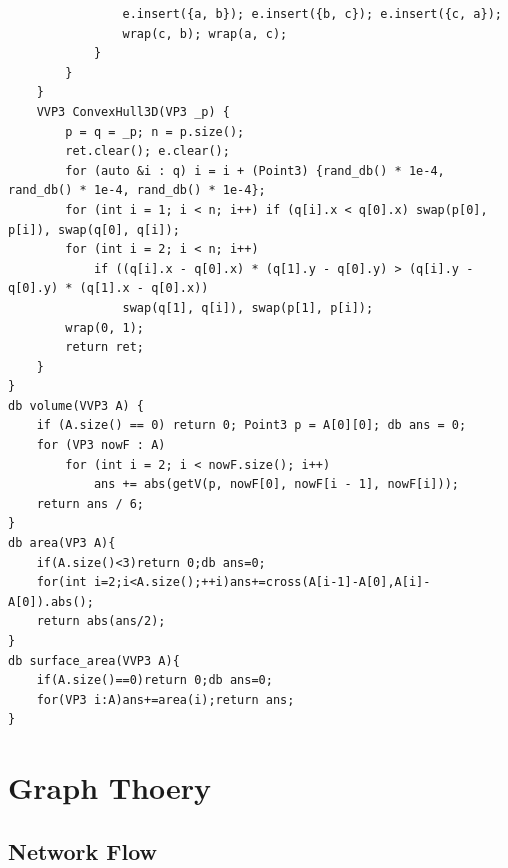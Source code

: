 \documentclass[twoside]{article}
\begin{document}
\begin{lstlisting}
                e.insert({a, b}); e.insert({b, c}); e.insert({c, a});
                wrap(c, b); wrap(a, c);
            }
        }
    }
    VVP3 ConvexHull3D(VP3 _p) {
        p = q = _p; n = p.size();
        ret.clear(); e.clear();
        for (auto &i : q) i = i + (Point3) {rand_db() * 1e-4, rand_db() * 1e-4, rand_db() * 1e-4};
        for (int i = 1; i < n; i++) if (q[i].x < q[0].x) swap(p[0], p[i]), swap(q[0], q[i]);
        for (int i = 2; i < n; i++) 
            if ((q[i].x - q[0].x) * (q[1].y - q[0].y) > (q[i].y - q[0].y) * (q[1].x - q[0].x)) 
                swap(q[1], q[i]), swap(p[1], p[i]);
        wrap(0, 1);
        return ret;
    }
}
db volume(VVP3 A) {
    if (A.size() == 0) return 0; Point3 p = A[0][0]; db ans = 0;
    for (VP3 nowF : A)
        for (int i = 2; i < nowF.size(); i++)
            ans += abs(getV(p, nowF[0], nowF[i - 1], nowF[i]));
    return ans / 6;
}
db area(VP3 A){
    if(A.size()<3)return 0;db ans=0;
    for(int i=2;i<A.size();++i)ans+=cross(A[i-1]-A[0],A[i]-A[0]).abs();
    return abs(ans/2);
}
db surface_area(VVP3 A){
    if(A.size()==0)return 0;db ans=0;
    for(VP3 i:A)ans+=area(i);return ans;
}\end{lstlisting}
\clearpage\section{Graph Thoery}
\subsection{Network Flow}
\end{document}
